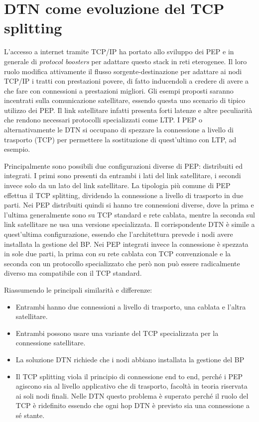 \documentclass[12pt,a4paper,oneside]{book}
\begin{document}
		
		\section{DTN come evoluzione del TCP splitting}
		L'accesso a internet tramite TCP/IP ha portato allo sviluppo dei PEP e in generale di {\it protocol boosters } per adattare questo stack in reti eterogenee. Il loro ruolo modifica attivamente il flusso sorgente-destinazione per adattare ai nodi TCP/IP i tratti con prestazioni povere, di fatto inducendoli a credere di avere a che fare con connessioni a prestazioni migliori. Gli esempi proposti saranno incentrati sulla comunicazione satellitare, essendo questa uno scenario di tipico utilizzo dei PEP. Il link satellitare infatti presenta forti latenze e altre peculiarità che rendono necessari protocolli specializzati come LTP. I PEP o alternativamente le DTN si occupano di spezzare la connessione a livello di trasporto (TCP) per permettere la sostituzione di quest'ultimo con LTP, ad esempio. 
		
		Principalmente sono possibili due configurazioni diverse di PEP: distribuiti ed integrati. I primi sono presenti da entrambi i lati del link satellitare, i secondi invece solo da un lato del link satellitare. 
		La tipologia più comune di PEP effettua il TCP splitting, dividendo la connessione a livello di trasporto in due parti. Nei PEP distribuiti quindi si hanno tre connessioni diverse, dove la prima e l'ultima generalmente sono su TCP standard e rete cablata, mentre la seconda sul link satellitare ne usa una versione specializzata.
		Il corrispondente DTN è simile a quest'ultima configurazione, essendo che l'architettura prevede i nodi avere installata la gestione del BP.
		Nei PEP integrati invece la connessione è spezzata in sole due parti, la prima con su rete cablata con TCP convenzionale e la seconda con un protocollo specializzato che però non può essere radicalmente diverso ma compatibile con il TCP standard.
		
		Riassumendo le principali similarità e differenze:
		\begin{itemize}
			\item Entrambi hanno due connessioni a livello di trasporto, una cablata e l'altra satellitare.
			\item Entrambi possono usare una variante del TCP specializzata per la connessione satellitare.
			\item La soluzione DTN richiede che i nodi abbiano installata la gestione del BP
			\item Il TCP splitting viola il principio di connessione end to end, perché i PEP agiscono sia al livello applicativo che di trasporto, facoltà in teoria riservata ai soli nodi finali. Nelle DTN questo problema è superato perché il ruolo del TCP è ridefinito essendo che ogni hop DTN è previsto sia una connessione a sé stante.
 		\end{itemize}
		
\end{document}
